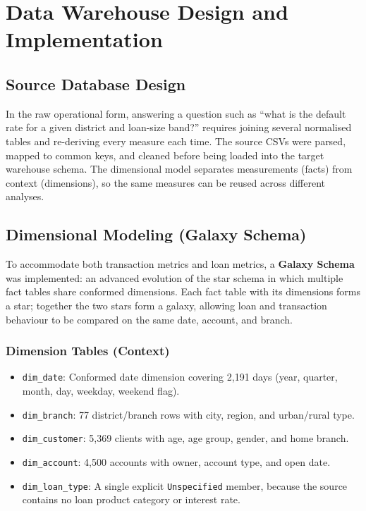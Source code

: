 \chapter{Data Warehouse Design and Implementation}
\section{Source Database Design}
In the raw operational form, answering a question such as ``what is the default rate for a given district and loan-size band?'' requires joining several normalised tables and re-deriving every measure each time. The source CSVs were parsed, mapped to common keys, and cleaned before being loaded into the target warehouse schema. The dimensional model separates measurements (facts) from context (dimensions), so the same measures can be reused across different analyses.

\section{Dimensional Modeling (Galaxy Schema)}
To accommodate both transaction metrics and loan metrics, a \textbf{Galaxy Schema} was implemented: an advanced evolution of the star schema in which multiple fact tables share conformed dimensions. Each fact table with its dimensions forms a star; together the two stars form a galaxy, allowing loan and transaction behaviour to be compared on the same date, account, and branch.

\subsection{Dimension Tables (Context)}
\begin{itemize}
    \item \texttt{dim\_date}: Conformed date dimension covering 2,191 days (year, quarter, month, day, weekday, weekend flag).
    \item \texttt{dim\_branch}: 77 district/branch rows with city, region, and urban/rural type.
    \item \texttt{dim\_customer}: 5,369 clients with age, age group, gender, and home branch.
    \item \texttt{dim\_account}: 4,500 accounts with owner, account type, and open date.
    \item \texttt{dim\_loan\_type}: A single explicit \texttt{Unspecified} member, because the source contains no loan product category or interest rate.
\end{itemize}

